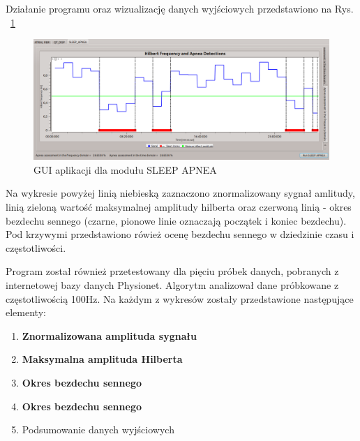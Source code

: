 Działanie programu oraz wizualizację danych wyjściowych przedstawiono na Rys. ~\ref{fig:gui1}
\begin{figure}[H]
\centering
\includegraphics[scale=0.4]{SLEEP_APNEA/img/gui1.png}
\caption{GUI aplikacji dla modułu SLEEP APNEA}
\label{fig:gui1}
\end{figure} 
Na wykresie powyżej linią niebieską zaznaczono znormalizowany sygnał amlitudy, linią zieloną wartość maksymalnej amplitudy hilberta oraz czerwoną linią - okres bezdechu sennego (czarne, pionowe linie oznaczają początek i koniec bezdechu). Pod krzywymi przedstawiono rówież ocenę bezdechu sennego w dziedzinie czasu i częstotliwości.

Program został również przetestowany dla pięciu próbek danych, pobranych z internetowej bazy danych Physionet. Algorytm analizował dane próbkowane z częstotliwością 100Hz.
Na każdym z wykresów zostały przedstawione następujące elementy:
\begin{enumerate}
 \item \textbf {\color{blue}Znormalizowana amplituda sygnału}
 \item \textbf {\color{black}Maksymalna amplituda Hilberta}
 \item \textbf {\color{red}Okres bezdechu sennego}
 \item \textbf {\color{green}Okres bezdechu sennego}
 \item {Podsumowanie danych wyjściowych}
\end{enumerate}

